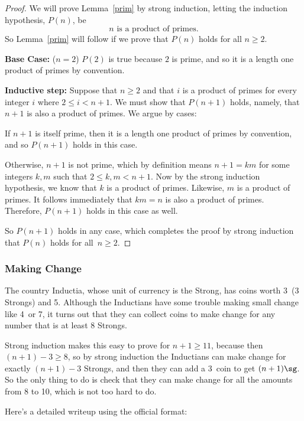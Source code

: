 \begin{proof}

We will prove Lemma~\ref{prim} by strong induction, letting the induction
hypothesis, $P(n)$, be
\[
n \text{ is a product of primes}.
\]
So Lemma~\ref{prim} will follow if we prove that $P(n)$ holds for all $n
\geq 2$.

\textbf{Base Case:} ($n=2$) $P(2)$ is true because $2$ is prime, and so it is
a length one product of primes by convention.

\textbf{Inductive step:} Suppose that $n \geq 2$ and that $i$ is a product
of primes for every integer $i$ where $2 \leq i < n+1$.  We must show that
$P(n+1)$ holds, namely, that $n+1$ is also a product of primes.  We argue
by cases:

If $n+1$ is itself prime, then it is a length one product of primes by
convention, and so $P(n+1)$ holds in this case.

Otherwise, $n + 1$ is not prime, which by definition means $n+1 = km$ for
some integers $k,m$ such that $2 \leq k,m < n+1$.  Now by the strong induction
hypothesis, we know that $k$ is a product of primes.  Likewise,
$m$ is a product of primes.  It follows immediately that $km = n$ is
also a product of primes.  Therefore, $P(n+1)$ holds in this case as well.

So $P(n+1)$ holds in any case, which completes the proof by strong
induction that $P(n)$ holds for all~$n \ge 2$.

\end{proof}

\subsubsection{Making Change}

The country Inductia, whose unit of currency is the Strong, has coins
worth 3\sg\ (3 Strongs) and 5\sg.  Although the Inductians have some
trouble making small change like 4\sg\ or 7\sg, it turns out that they
can collect coins to make change for any number that is at least 8
Strongs.

Strong induction makes this easy to prove for $n+1 \ge 11$, because then
$(n+1)-3 \ge 8$, so by strong induction the Inductians can make change for
exactly $(n+1)-3$ Strongs, and then they can add a 3\sg\ coin to get
$(n+1)\sg$.  So the only thing to do is check that they can make change
for all the amounts from 8 to 10\sg, which is not too hard to do.

Here's a detailed writeup using the official format:

